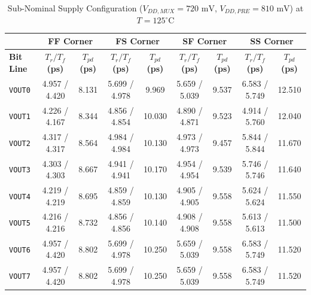 \begin{table}[H]
    \centering
    \renewcommand{\arraystretch}{1.3}
    \setlength{\tabcolsep}{4pt}
    \small
    \begin{tabular}{|l|cc|cc|cc|cc|}
        \hline
        & \multicolumn{2}{c|}{\textbf{FF Corner}} & \multicolumn{2}{c|}{\textbf{FS Corner}} & \multicolumn{2}{c|}{\textbf{SF Corner}} & \multicolumn{2}{c|}{\textbf{SS Corner}} \\ \hline
        \textbf{Bit Line} & \textbf{$T_r / T_f$ (ps)} & \textbf{$T_{pd}$ (ps)} & \textbf{$T_r / T_f$ (ps)} & \textbf{$T_{pd}$ (ps)} & \textbf{$T_r / T_f$ (ps)} & \textbf{$T_{pd}$ (ps)} & \textbf{$T_r / T_f$ (ps)} & \textbf{$T_{pd}$ (ps)} \\ \hline
        \texttt{VOUT0} & 4.957 / 4.420 & 8.131 & 5.699 / 4.978 & 9.969 & 5.659 / 5.039 & 9.537 & 6.583 / 5.749 & 12.510 \\ 
        \texttt{VOUT1} & 4.226 / 4.167 & 8.344 & 4.856 / 4.854 & 10.030 & 4.890 / 4.871 & 9.523 & 4.914 / 5.760 & 12.040 \\ 
        \texttt{VOUT2} & 4.317 / 4.317 & 8.564 & 4.984 / 4.984 & 10.130 & 4.973 / 4.973 & 9.457 & 5.844 / 5.844 & 11.670 \\ 
        \texttt{VOUT3} & 4.303 / 4.303 & 8.667 & 4.941 / 4.941 & 10.170 & 4.954 / 4.954 & 9.539 & 5.746 / 5.746 & 11.640 \\ 
        \texttt{VOUT4} & 4.219 / 4.219 & 8.695 & 4.859 / 4.859 & 10.130 & 4.905 / 4.905 & 9.558 & 5.624 / 5.624 & 11.550 \\ 
        \texttt{VOUT5} & 4.216 / 4.216 & 8.732 & 4.856 / 4.856 & 10.140 & 4.908 / 4.908 & 9.558 & 5.613 / 5.613 & 11.500 \\ 
        \texttt{VOUT6} & 4.957 / 4.420 & 8.802 & 5.699 / 4.978 & 10.250 & 5.659 / 5.039 & 9.558 & 6.583 / 5.749 & 11.520 \\ 
        \texttt{VOUT7} & 4.957 / 4.420 & 8.802 & 5.699 / 4.978 & 10.250 & 5.659 / 5.039 & 9.558 & 6.583 / 5.749 & 11.520 \\ \hline
    \end{tabular}
    \vspace{2mm}
    \caption{Sub-Nominal Supply Configuration ($V_{DD,MUX} = 720\text{ mV}$, $V_{DD,PRE} = 810\text{ mV}$) at $T = 125^{\circ}\text{C}$}
    \label{tab:subnominal_sym_125}
\end{table}

